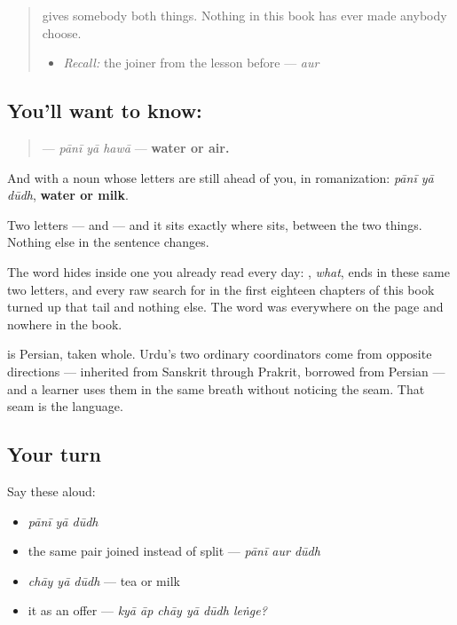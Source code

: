 \label{lesson:UR-C20-ya}



\begin{quote}
\textbf{} gives somebody both things. Nothing in this book has ever made anybody choose.

\begin{itemize}
\raggedright
  \item \emph{Recall:} the joiner from the lesson before — \emph{aur}
\end{itemize}
\end{quote}

\subsection*{You'll want to know: }
\begin{quote}
\textbf{  } — \emph{pānī yā hawā} — \textbf{water or air.}
\end{quote}

And with a noun whose letters are still ahead of you, in romanization: \emph{pānī yā dūdh}, \textbf{water or milk}.

Two letters — \textbf{} and \textbf{} — and it sits exactly where \textbf{} sits, between the two things. Nothing else in the sentence changes.

The word hides inside one you already read every day: \textbf{}, \emph{what}, ends in these same two letters, and every raw search for \textbf{} in the first eighteen chapters of this book turned up that tail and nothing else. The word was everywhere on the page and nowhere in the book.

\begin{cousinweb}
\textbf{} is Persian, taken whole. Urdu's two ordinary coordinators come from opposite directions — \textbf{} inherited from Sanskrit through Prakrit, \textbf{} borrowed from Persian — and a learner uses them in the same breath without noticing the seam. That seam is the language.
\end{cousinweb}

\subsection*{Your turn}
Say these aloud:

\begin{itemize}
\raggedright
  \item \emph{pānī yā dūdh}
  \item the same pair joined instead of split — \emph{pānī aur dūdh}
  \item \emph{chāy yā dūdh} — tea or milk
  \item it as an offer — \emph{kyā āp chāy yā dūdh leṅge?}
\end{itemize}


